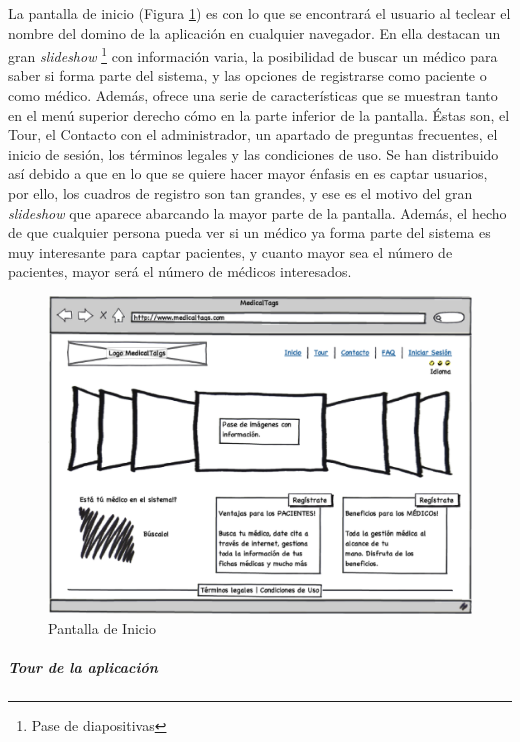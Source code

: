 \documentclass[a4paper,oneside,11pt]{book}
\begin{document}
		La pantalla de inicio (Figura \ref{fig:pantalla_de_inicio}) es con lo que se encontrará el usuario al teclear el nombre del domino de la aplicación en cualquier navegador. En ella destacan un gran \textit{slideshow} \footnote{Pase de diapositivas} con información varia, la posibilidad de buscar un médico para saber si forma parte del sistema, y las opciones de registrarse como paciente o como médico. Además, ofrece una serie de características que se muestran tanto en el menú superior derecho cómo en la parte inferior de la pantalla. Éstas son, el Tour, el Contacto con el administrador, un apartado de preguntas frecuentes, el inicio de sesión, los términos legales y las condiciones de uso. Se han distribuido así debido a que en lo que se quiere hacer mayor énfasis en es captar usuarios, por ello, los cuadros de registro son tan grandes, y ese es el motivo del gran \textit{slideshow} que aparece abarcando la mayor parte de la pantalla. Además, el hecho de que cualquier persona pueda ver si un médico ya forma parte del sistema es muy interesante para captar pacientes, y cuanto mayor sea el número de pacientes, mayor será el número de médicos interesados.
	
		
		\begin{figure}[H]
		  \centering
		    \includegraphics[width=15cm]{img/eps/1_Inicio.eps}
		  \caption{Pantalla de Inicio}
		  \label{fig:pantalla_de_inicio}
		\end{figure}
			
		\subparagraph{Tour de la aplicación} %
		\label{par:tour_de_la_aplicacion}
		
\end{document}
